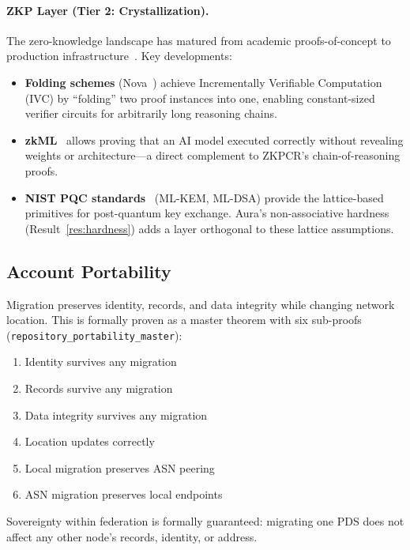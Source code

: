 \documentclass[12pt,a4paper]{article}
\begin{document}
\paragraph{ZKP Layer (Tier 2: Crystallization).} The zero-knowledge landscape has matured from academic proofs-of-concept to production infrastructure~\cite{ben-sasson2018starks}. Key developments:
\begin{itemize}[noitemsep]
\item \textbf{Folding schemes} (Nova~\cite{kothapalli2022nova}) achieve Incrementally Verifiable Computation (IVC) by ``folding'' two proof instances into one, enabling constant-sized verifier circuits for arbitrarily long reasoning chains.
\item \textbf{zkML}~\cite{zkml2024} allows proving that an AI model executed correctly without revealing weights or architecture---a direct complement to ZKPCR's chain-of-reasoning proofs.
\item \textbf{NIST PQC standards}~\cite{nist2024pqc} (ML-KEM, ML-DSA) provide the lattice-based primitives for post-quantum key exchange. Aura's non-associative hardness (Result~\ref{res:hardness}) adds a layer orthogonal to these lattice assumptions.
\end{itemize}

\subsection{Account Portability}

Migration preserves identity, records, and data integrity while changing network location. This is formally proven as a master theorem with six sub-proofs (\texttt{repository\_portability\_master}):

\begin{enumerate}[noitemsep]
\item Identity survives any migration
\item Records survive any migration
\item Data integrity survives any migration
\item Location updates correctly
\item Local migration preserves ASN peering
\item ASN migration preserves local endpoints
\end{enumerate}

Sovereignty within federation is formally guaranteed: migrating one PDS does not affect any other node's records, identity, or address.
\end{document}

